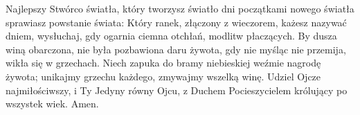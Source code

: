 Najlepszy Stwórco światła,
który tworzysz światło dni
początkami nowego światła
sprawiasz powstanie świata:
\vskip 1mm
Który ranek, złączony z wieczorem,
każesz nazywać dniem,
wysłuchaj, gdy ogarnia ciemna otchłań,
modlitw płaczących.
\vskip 1mm
By dusza winą obarczona,
nie była pozbawiona daru żywota,
gdy nie myśląc nie przemija,
wikła się w grzechach.
\vskip 1mm
Niech zapuka do bramy niebieskiej
weźmie nagrodę żywota;
unikajmy grzechu każdego,
zmywajmy wszelką winę.
\vskip 1mm
Udziel Ojcze najmiłościwszy,
i Ty Jedyny równy Ojcu,
z Duchem Pocieszycielem
królujący po wszystek wiek.
Amen.
\\

